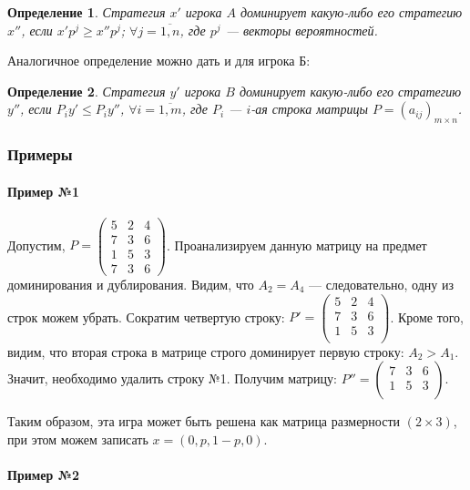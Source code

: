 \documentclass{article}
\newtheorem{definition}{Определение}
\begin{document}
\begin{definition}
    Стратегия $x'$ игрока $A$ доминирует какую-либо его стратегию $x''$, если $x' p^{j} \ge x'' p^{j}$; $\forall j = \overline{1, n}$, где $p^{j}$ — векторы вероятностей.
\end{definition}

Аналогичное определение можно дать и для игрока Б:

\begin{definition}
    Стратегия $y'$ игрока $B$ доминирует какую-либо его стратегию $y''$, если $P_{i} y' \le P_{i} y''$, $\forall i = \overline{1, m}$, где $P_{i}$ — $i$-ая строка матрицы $P = (a_{i j})_{m \times n}$.
\end{definition}

\subsubsection{Примеры}

\paragraph{Пример №1}

Допустим, $P = \begin{pmatrix}
    5 & 2 & 4 \\
    7 & 3 & 6 \\
    1 & 5 & 3 \\
    7 & 3 & 6
\end{pmatrix}$. Проанализируем данную матрицу на предмет доминирования и дублирования. Видим, что $A_{2} = A_{4}$ — следовательно, одну из строк можем убрать. Сократим четвертую строку: $P' = \begin{pmatrix}
    5 & 2 & 4 \\
    7 & 3 & 6 \\
    1 & 5 & 3 \\
\end{pmatrix}$. Кроме того, видим, что вторая строка в матрице строго доминирует первую строку: $A_{2} > A_{1}$. Значит, необходимо удалить строку №1. Получим матрицу: $P'' = \begin{pmatrix}
    7 & 3 & 6 \\
    1 & 5 & 3 \\
\end{pmatrix}$.

Таким образом, эта игра может быть решена как матрица размерности $(2 \times 3)$, при этом можем записать $x = (0, p, 1 - p, 0)$.

\paragraph{Пример №2}
\end{document}
